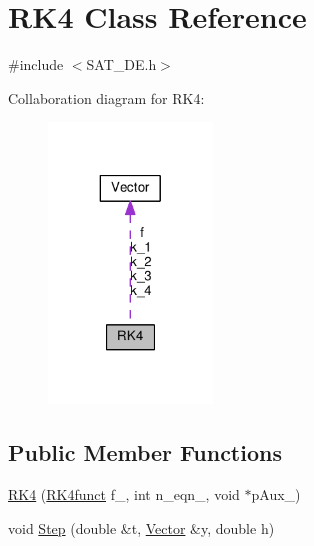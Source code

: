 \hypertarget{classRK4}{\section{R\-K4 Class Reference}
\label{classRK4}
}


{\ttfamily \#include $<$S\-A\-T\-\_\-\-D\-E.\-h$>$}



Collaboration diagram for R\-K4\-:\nopagebreak
\begin{figure}[H]
\begin{center}
\leavevmode
\includegraphics[width=124pt]{classRK4__coll__graph}
\end{center}
\end{figure}
\subsection*{Public Member Functions}
\begin{DoxyCompactItemize}
\item 
\hyperlink{classRK4_ac9c9485e3509428bc57a335f4489fc3f}{R\-K4} (\hyperlink{SAT__DE_8h_ad4e61e8764fd6a7d9f144dec4a8b17cf}{R\-K4funct} f\-\_\-, int n\-\_\-eqn\-\_\-, void $\ast$p\-Aux\-\_\-)
\item 
void \hyperlink{classRK4_aa520ec0bb1bb2ccdd13ab48418303706}{Step} (double \&t, \hyperlink{classVector}{Vector} \&y, double h)
\end{DoxyCompactItemize}
